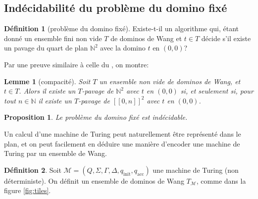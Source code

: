 \documentclass{scrartcl}
\newcommand{\N}{\mathbb N}
\newtheorem{lemme}{Lemme}
\newtheorem{proposition}{Proposition}
\theoremstyle{definition}
\newtheorem*{definition}{Définition}
\theoremstyle{remark}
\begin{document}
\subsection{Indécidabilité du problème du domino fixé}

\begin{definition}[problème du domino fixé]
  Existe-t-il un algorithme qui, étant donné un ensemble fini non vide $T$ de dominos de Wang et $t\in T$ décide s'il existe un pavage du quart de plan $\N^2$ avec la domino $t$ en $(0,0)$?
\end{definition}

Par une preuve similaire à celle du , on montre:

\begin{lemme}[compacité]
  Soit $T$ un ensemble non vide de dominos de Wang, et $t\in T$. Alors il existe un $T$-pavage de $\N^2$ avec $t$ en $(0,0)$ si, et seulement si, pour tout $n\in\N$ il existe un $T$-pavage de $[\![0,n]\!]^2$ avec $t$ en $(0,0)$.
\end{lemme}

\begin{proposition}
  Le problème du domino fixé est indécidable.
\end{proposition}

Un calcul d'une machine de Turing peut naturellement être représenté dans le plan, et on peut facilement en déduire une manière d'encoder une machine de Turing par un ensemble de Wang. 

\begin{definition}
  Soit $\mathcal M=(Q,\Sigma,\Gamma,\Delta,q_{\mathrm{init}}, q_{\mathrm{acc}})$ une machine de Turing (non déterministe). On définit un ensemble de dominos de Wang $T_\mathcal M$, comme dans la figure \ref{fig:tiles}.
\end{definition}
\end{document}
